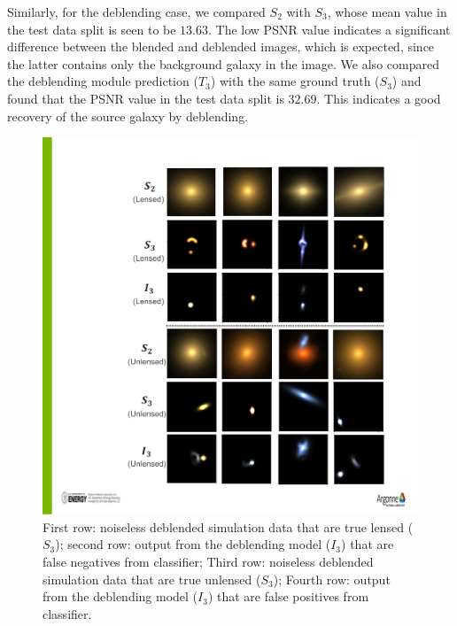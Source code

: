\documentclass[12pt, twocolumn, apj]{openjournal}
\begin{document}
Similarly, for the deblending case, we compared $S_2$ with $S_3$, whose mean value in the test data split is seen to be $13.63$. The low PSNR value indicates a significant difference between the blended and deblended images, which is expected, since the latter contains only the background galaxy in the image. We also compared the deblending module prediction ($T_3$)  with the same ground truth ($S_3$) and found that the PSNR value in the test data split is $32.69$. This indicates a good recovery of the source galaxy by deblending. 

\begin{figure}[!htp]
\centering
\includegraphics[width=\linewidth]{"Figures/False_Positive_False_Negative_V2.pdf"}
\caption{First row: noiseless deblended simulation data that are true lensed ($S_3$); second row: output from the deblending model ($I_3$) that are false negatives from classifier; Third row: noiseless deblended simulation data that are true unlensed ($S_3$); Fourth row: output from the deblending model ($I_3$) that are false positives from classifier.} 
\label{Fig:false_pred} 
\end{figure}
\end{document}
